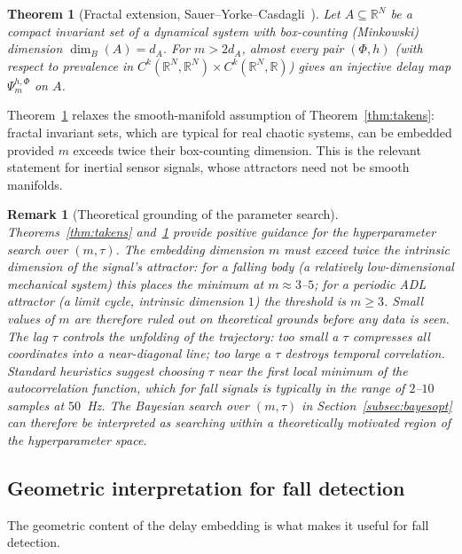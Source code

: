 \documentclass[onluarkali,ingilizce,yukseklisans,karton,LisansustuEgitim]{itutez}
\newtheorem{theorem}{Theorem}[chapter]
\newtheorem{remark}{Remark}[chapter]
\providecommand{\R}{\mathbb{R}}
\providecommand{\1}{\mathbf{1}}
\begin{document}
\begin{theorem}[Fractal extension, Sauer--Yorke--Casdagli~\parencite{sauer1991embedology}]
\label{thm:syc}
Let $A\subseteq\R^N$ be a compact invariant set of a dynamical system with box-counting (Minkowski) dimension $\dim_B(A)=d_A$. For $m>2d_A$, almost every pair $(\Phi,h)$ (with respect to prevalence in $C^k(\R^N,\R^N)\times C^k(\R^N,\R)$) gives an injective delay map $\Psi^{h,\Phi}_m$ on $A$.
\end{theorem}

Theorem~\ref{thm:syc} relaxes the smooth-manifold assumption of Theorem~\ref{thm:takens}: fractal invariant sets, which are typical for real chaotic systems, can be embedded provided $m$ exceeds twice their box-counting dimension. This is the relevant statement for inertial sensor signals, whose attractors need not be smooth manifolds.

\begin{remark}[Theoretical grounding of the parameter search]
\label{rem:embedding-guidance}
Theorems~\ref{thm:takens} and~\ref{thm:syc} provide positive guidance for the hyperparameter search over $(m,\tau)$. The embedding dimension $m$ must exceed twice the intrinsic dimension of the signal's attractor: for a falling body (a relatively low-dimensional mechanical system) this places the minimum at $m\approx 3$--$5$; for a periodic ADL attractor (a limit cycle, intrinsic dimension $1$) the threshold is $m\geq 3$. Small values of $m$ are therefore ruled out on theoretical grounds before any data is seen. The lag $\tau$ controls the unfolding of the trajectory: too small a $\tau$ compresses all coordinates into a near-diagonal line; too large a $\tau$ destroys temporal correlation. Standard heuristics suggest choosing $\tau$ near the first local minimum of the autocorrelation function, which for fall signals is typically in the range of $2$--$10$ samples at $50$~Hz. The Bayesian search over $(m,\tau)$ in Section~\ref{subsec:bayesopt} can therefore be interpreted as searching within a theoretically motivated region of the hyperparameter space.
\end{remark}

\subsection{Geometric interpretation for fall detection}
\label{subsubsec:geometry}

The geometric content of the delay embedding is what makes it useful for fall detection.
\end{document}
